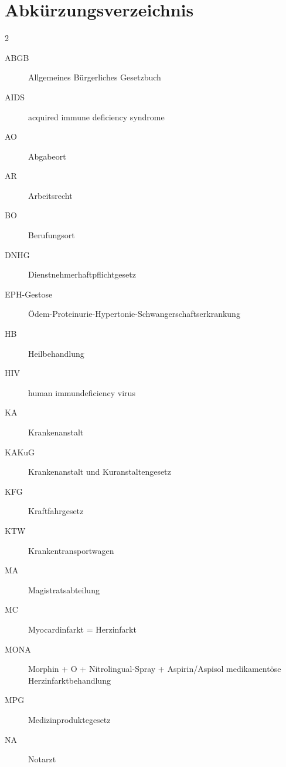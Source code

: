 \section*{Abk\"urzungsverzeichnis}
\begin{multicols}{2}
\begin{description}
\item[ABGB]  Allgemeines B\"urgerliches Gesetzbuch

\item[AIDS]  acquired immune deficiency syndrome

\item[AO]  Abgabeort

\item[AR]  Arbeitsrecht

\item[BO]  Berufungsort

\item[DNHG]  Dienstnehmer\-haft\-pflicht\-gesetz

\item[EPH-Gestose] 
\"Odem-Protein\-urie-Hypertonie-Schwanger\-schafts\-erkrankung

\item[HB]   Heilbehandlung 

\item[HIV]  human immundeficiency virus

\item[KA]  Krankenanstalt

\item[KAKuG]  Krankenanstalt und
Kur\-anstaltengesetz

\item[KFG]  Kraftfahrgesetz


\item[KTW]  Krankentransportwagen

\item[MA]  Magistratsabteilung

\item[MC]  Myocardinfarkt = Herz\-infarkt

\item[MONA]  Morphin + O +
Nitro\-lingual-Spray + Aspirin/Aspisol medikament\-\"ose
Herz\-infarkt\-be\-handlung

\item[MPG]  Medizinproduktegesetz

\item[NA]  Notarzt


\end{description}
\end{multicols}
